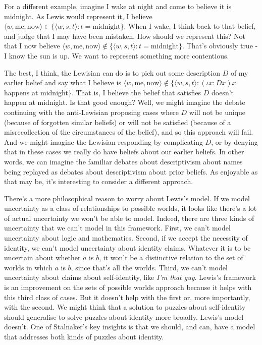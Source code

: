 For a different example, imagine I wake at night and come to believe it is midnight. As Lewis would represent it, I believe \(\langle w, \text{me}, \text{now}\rangle  \in \{\langle w, s, t\rangle : t = \text{midnight}\}\). When I wake, I think back to that belief, and judge that I may have been mistaken. How should we represent this? Not that I now believe \(\langle w, \text{me}, \text{now}\rangle  \notin \{\langle w, s, t\rangle : t = \text{midnight}\}\). That's obviously true - I know the sun is up. We want to represent something more contentious. 

The best, I think, the Lewisian can do is to pick out some description \(D\) of my earlier belief and say what I believe is \(\langle w, \text{me}, \text{now}\rangle  \notin \{\langle w, s, t\rangle : (\iota x: Dx) x \) happens at midnight\}. That is, I believe the belief that satisfies \(D\) doesn't happen at midnight. Is that good enough? Well, we might imagine the debate continuing with the anti-Lewisian proposing cases where \(D\) will not be unique (because of forgotten similar beliefs) or will not be satisfied (because of a misrecollection of the circumstances of the belief), and so this approach will fail. And we might imagine the Lewisian responding by complicating \(D\), or by denying that in these cases we really do have beliefs about our earlier beliefs. In other words, we can imagine the familiar debates about descriptivism about names being replayed as debates about descriptivism about prior beliefs. As enjoyable as that may be, it's interesting to consider a different approach.

There's a more philosophical reason to worry about Lewis's model. If we model uncertainty as a class of relationships to possible worlds, it looks like there's a lot of actual uncertainty we won't be able to model. Indeed, there are three kinds of uncertainty that we can't model in this framework. First, we can't model uncertainty about logic and mathematics. Second, if we accept the necessity of identity, we can't model uncertainty about identity claims. Whatever it is to be uncertain about whether \(a\) is \(b\), it won't be a distinctive relation to the set of worlds in which \(a\) is \(b\), since that's all the worlds. Third, we can't model uncertainty about claims about self-identity, like \textit{I'm that guy}. Lewis's framework is an improvement on the sets of possible worlds approach because it helps with this third class of cases. But it doesn't help with the first or, more importantly, with the second. We might think that a solution to puzzles about self-identity should generalise to solve puzzles about identity more broadly. Lewis's model doesn't. One of Stalnaker's key insights is that we should, and can, have a model that addresses both kinds of puzzles about identity.


